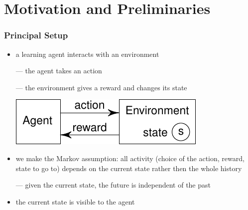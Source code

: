 \section[Preliminaries]{Motivation and Preliminaries}

\begin{frame}\frametitle{Principal Setup}

\begin{itemize}

\item a learning agent interacts with an environment

--- the agent takes an action

--- the environment gives a reward and changes its state

\bigskip

\includegraphics[scale=1]{agent_environment}

\item we make the Markov assumption: all activity (choice of the
action, reward, state to go to) depends on the
current state rather then the whole history

--- given the current state, the future is independent of the past

\item the current state is visible to the agent

\end{itemize}
\end{frame}


